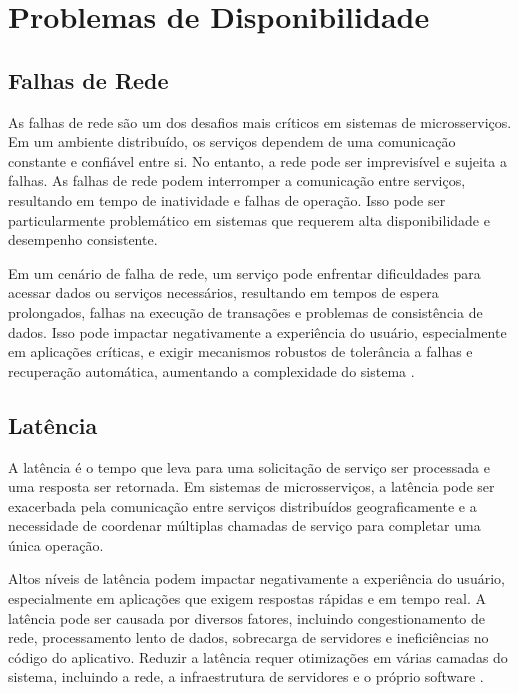 \section{Problemas de Disponibilidade}

\subsection{Falhas de Rede}

As falhas de rede são um dos desafios mais críticos em sistemas de microsserviços. Em um ambiente distribuído, os serviços dependem de uma comunicação constante e confiável entre si. No entanto, a rede pode ser imprevisível e sujeita a falhas. As falhas de rede podem interromper a comunicação entre serviços, resultando em tempo de inatividade e falhas de operação. Isso pode ser particularmente problemático em sistemas que requerem alta disponibilidade e desempenho consistente.

Em um cenário de falha de rede, um serviço pode enfrentar dificuldades para acessar dados ou serviços necessários, resultando em tempos de espera prolongados, falhas na execução de transações e problemas de consistência de dados. Isso pode impactar negativamente a experiência do usuário, especialmente em aplicações críticas, e exigir mecanismos robustos de tolerância a falhas e recuperação automática, aumentando a complexidade do sistema \cite{tanenbaum2007, brewer2000}.

\subsection{Latência}

A latência é o tempo que leva para uma solicitação de serviço ser processada e uma resposta ser retornada. Em sistemas de microsserviços, a latência pode ser exacerbada pela comunicação entre serviços distribuídos geograficamente e a necessidade de coordenar múltiplas chamadas de serviço para completar uma única operação.

Altos níveis de latência podem impactar negativamente a experiência do usuário, especialmente em aplicações que exigem respostas rápidas e em tempo real. A latência pode ser causada por diversos fatores, incluindo congestionamento de rede, processamento lento de dados, sobrecarga de servidores e ineficiências no código do aplicativo. Reduzir a latência requer otimizações em várias camadas do sistema, incluindo a rede, a infraestrutura de servidores e o próprio software \cite{dean2013}.

